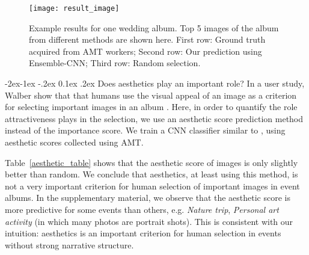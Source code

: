 \documentclass[10pt,twocolumn,letterpaper]{article}
\makeatletter
\renewcommand\subsubsection{\@startsection{subsubsection}{3}{\z@}%
                {-2ex\@plus -1ex \@minus -.2ex}%
                {0.1ex \@plus .2ex}%
                {\normalfont\normalsize\bfseries}}
\makeatother
\begin{document}
\begin{figure}[h]
\begin{center}
\texttt{[image: result\_image]}
\end{center}
\caption{Example results for one wedding album. Top 5 images of the album from different methods are shown here. First row: Ground truth acquired from AMT workers; Second row: Our prediction using Ensemble-CNN; Third row: Random selection.}
\label{figure5}
\end{figure}

\subsubsection{Does aesthetics play an important role?}
In a user study, Walber \etal show that that humans use the visual appeal of an image as a criterion for selecting important images in an album \cite{gaze}. Here, in order to quantify the role attractiveness plays in the selection, we use an aesthetic score prediction method instead of the importance score. We  train a CNN classifier similar to \cite{aesthe_14}, using aesthetic scores collected using AMT.  

Table~\ref{aesthetic_table} shows that the aesthetic score of images is only slightly better than random. We conclude that aesthetics, at least using this method, is not a very important criterion for human selection of important images in event albums. In the supplementary material, we observe that the aesthetic score is more predictive for some events than others, e.g. \textit{Nature trip}, \textit{Personal art activity} (in which many photos are portrait shots). This is consistent with our intuition: aesthetics is an important criterion for human selection in events without strong narrative structure.
\end{document}
